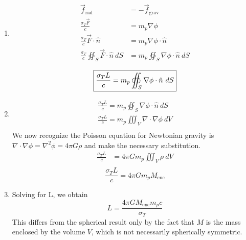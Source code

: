 \documentclass{article}
\begin{document}
\section{}

\begin{enumerate}[label=\alph*.]
\item
\begin{equation*}
    \begin{split}
        \vec{f}_{\mathrm{rad}} &= -\vec{f}_{\mathrm{grav}}\\
        \frac{\sigma_T \vec{F}}{c} &= m_p \nabla \phi\\
        \frac{\sigma_T}{c}\vec{F}\cdot \hat{n} &= m_p \nabla \phi \cdot \hat{n}\\
        \frac{\sigma_T}{c} \oiint_S \vec{F}\cdot \hat{n} \ dS &= m_p \oiint_S \nabla \phi \cdot \hat{n} \ dS\\
    \end{split}
\end{equation*}
\begin{equation}
    \boxed{\frac{\sigma_T L}{c} = m_p \oiint_S \nabla \phi \cdot \hat{n} \ dS\\}
\end{equation}
%
\item
\begin{equation*}
    \begin{split}
        \frac{\sigma_T L}{c} = m_p \oiint_S \nabla \phi \cdot \hat{n} \ dS\\
        \frac{\sigma_T L}{c} = m_p \iiint_V \nabla \cdot \nabla \phi \ dV\\
    \end{split}
\end{equation*}
We now recognize the Poisson equation for Newtonian gravity is $\nabla \cdot \nabla \phi = \nabla^2\phi = 4\pi G\rho$ and make the necessary substitution.
\begin{equation*}
    \begin{split}
        \frac{\sigma_T L}{c} &= 4\pi G m_p \iiint_V \rho \ dV\\
    \end{split}
\end{equation*}
\begin{equation}
    \boxed{\frac{\sigma_T L}{c} = 4\pi G m_p M_{\mathrm{enc}}}
\end{equation}
%
\item
Solving for L, we obtain
\begin{equation}
    \boxed{L = \frac{4\pi G M_{\mathrm{enc}} m_p c}{\sigma_T}}
\end{equation}
This differs from the spherical result only by the fact that $M$ is the mass enclosed by the volume $V$, which is not necessarily spherically symmetric.
\end{enumerate}
\end{document}
